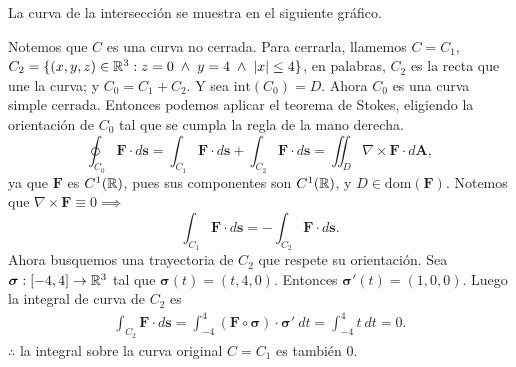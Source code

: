 
\begin{solution} 
La curva de la intersecci\'on se muestra en el siguiente gr\'afico.

\begin{center}
\end{center}

  Notemos que $C$ es una curva no cerrada. Para cerrarla, llamemos $C=C_1$, 
  $C_2=\{(x,y,z)\in\mathbb{R}^3:z=0\;\land\;y=4\;\land\;|x|\leq4\}$, en palabras, $C_2$ es la recta que une la curva; y $C_0=C_1+C_2$. Y sea $\text{int}(C_0)=D$. Ahora $C_0$ es una curva simple cerrada. Entonces podemos aplicar el teorema de Stokes, eligiendo la orientaci\'on de $C_0$ tal que se cumpla la regla de la mano derecha.
  \[
      \oint_{C_0}\mathbf{F}\cdot d\mathbf{s}= \int_{C_1}\mathbf{F}\cdot d\mathbf{s} + \int_{C_2}\mathbf{F}\cdot d\mathbf{s} = \iint_D \nabla\times\mathbf{F}\cdot d\mathbf{A},
  \]
  ya que $\mathbf{F}$ es $C^1(\mathbb{R})$, pues sus componentes son $C^1(\mathbb{R})$, y $D\in\text{dom}(\mathbf{F})$.
  Notemos que $\nabla\times\mathbf{F}\equiv0\implies$
  \[
     \int_{C_1}\mathbf{F}\cdot d\mathbf{s} =- \int_{C_2}\mathbf{F}\cdot d\mathbf{s}.
  \]
  Ahora busquemos una trayectoria de $C_2$ que respete su orientaci\'on. Sea $\boldsymbol{\sigma}:[-4,4]\rightarrow\mathbb{R}^3$
  tal que $\boldsymbol{\sigma}(t)=(t,4,0)$. Entonces $\boldsymbol{\sigma}'(t)=(1,0,0)$. Luego la integral de curva de $C_2$ es
  \begin{gather*}
    \int_{C_2}\mathbf{F}\cdot d\mathbf{s}
    =\int_{-4}^4 (\mathbf{F}\circ\boldsymbol{\sigma})\cdot\boldsymbol{\sigma}'\:dt
    =\int_{-4}^4 t\:dt = 0.
  \end{gather*}
  $\therefore$ la integral sobre la curva original $C=C_1$ es tambi\'en 0.
\end{solution}


